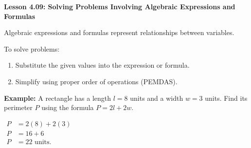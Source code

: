 \begin{center}
\textbf{Lesson 4.09: Solving Problems Involving Algebraic Expressions and Formulas}
\end{center}

\vspace*{-1.5ex}

\noindent Algebraic expressions and formulas represent relationships between variables.  

\noindent To solve problems:
    \begin{enumerate}
        \item Substitute the given values into the expression or formula.  
        \item Simplify using proper order of operations (PEMDAS).  
    \end{enumerate}


\noindent\textbf{Example:}  
A rectangle has a length \(l = 8\) units and a width \(w = 3\) units. Find its perimeter \(P\) using the formula \(P = 2l + 2w\).

{\centering $
\begin{aligned}
    P &= 2(8) + 2(3) \\
    P &= 16 + 6 \\
    P &= 22 \text{ units.}
\end{aligned}
$\par}

